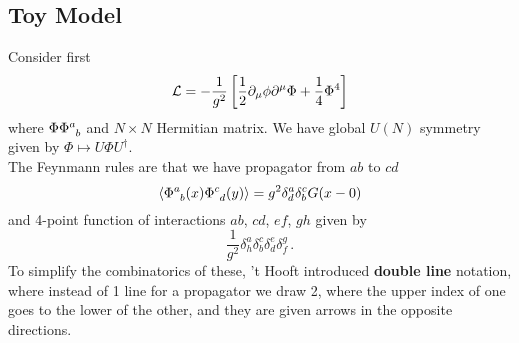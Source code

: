 \documentclass{article}
\begin{document}
\subsection{Toy Model}
Consider first 
\[
\mathcal{L} = - \frac{1}{g^2} \left[  \frac{1}{2} \partial_\mu \phi \partial^\mu \Phi + \frac{1}{4} \Phi^4 \right]
\]
where $\Phi \Phi\indices{^a_b}$ and $N\times N$ Hermitian matrix. We have global $U(N)$ symmetry given by $\Phi \mapsto U \Phi U^\dagger$. \\
The Feynmann rules are that we have propagator from $ab$ to $cd$ 
\[
\pangle{\Phi\indices{^a_b}(x) \Phi\indices{^c_d}(y)} = g^2 \delta^a_d \delta^c_b G(x-0)
\]
and 4-point function of interactions $ab$, $cd$, $ef$, $gh$ given by 
\[
\frac{1}{g^2} \delta^a_h \delta^c_b \delta^e_d \delta^g_f \, .
\]
To simplify the combinatorics of these, 't Hooft introduced \textbf{double line} notation, where instead of 1 line for a propagator we draw 2, where the upper index of one goes to the lower of the other, and they are given arrows in the opposite directions. 
\end{document}
